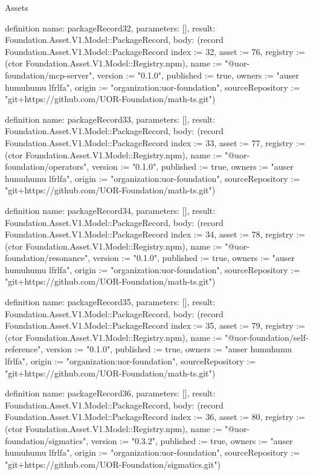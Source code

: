\begin{lexlean}{Assets}
\begin{semanticmodule}
definition{
  name: packageRecord32,
  parameters: [],
  result: Foundation.Asset.V1.Model::PackageRecord,
  body: (record Foundation.Asset.V1.Model::PackageRecord {index := 32, asset := 76, registry := (ctor Foundation.Asset.V1.Model::Registry.npm), name := "@uor-foundation/mcp-server", version := "0.1.0", published := true, owners := "auser humuhumu lfrlfa", origin := "organization:uor-foundation", sourceRepository := "git+https://github.com/UOR-Foundation/math-ts.git"})
}

definition{
  name: packageRecord33,
  parameters: [],
  result: Foundation.Asset.V1.Model::PackageRecord,
  body: (record Foundation.Asset.V1.Model::PackageRecord {index := 33, asset := 77, registry := (ctor Foundation.Asset.V1.Model::Registry.npm), name := "@uor-foundation/operators", version := "0.1.0", published := true, owners := "auser humuhumu lfrlfa", origin := "organization:uor-foundation", sourceRepository := "git+https://github.com/UOR-Foundation/math-ts.git"})
}

definition{
  name: packageRecord34,
  parameters: [],
  result: Foundation.Asset.V1.Model::PackageRecord,
  body: (record Foundation.Asset.V1.Model::PackageRecord {index := 34, asset := 78, registry := (ctor Foundation.Asset.V1.Model::Registry.npm), name := "@uor-foundation/resonance", version := "0.1.0", published := true, owners := "auser humuhumu lfrlfa", origin := "organization:uor-foundation", sourceRepository := "git+https://github.com/UOR-Foundation/math-ts.git"})
}

definition{
  name: packageRecord35,
  parameters: [],
  result: Foundation.Asset.V1.Model::PackageRecord,
  body: (record Foundation.Asset.V1.Model::PackageRecord {index := 35, asset := 79, registry := (ctor Foundation.Asset.V1.Model::Registry.npm), name := "@uor-foundation/self-reference", version := "0.1.0", published := true, owners := "auser humuhumu lfrlfa", origin := "organization:uor-foundation", sourceRepository := "git+https://github.com/UOR-Foundation/math-ts.git"})
}

definition{
  name: packageRecord36,
  parameters: [],
  result: Foundation.Asset.V1.Model::PackageRecord,
  body: (record Foundation.Asset.V1.Model::PackageRecord {index := 36, asset := 80, registry := (ctor Foundation.Asset.V1.Model::Registry.npm), name := "@uor-foundation/sigmatics", version := "0.3.2", published := true, owners := "auser humuhumu lfrlfa", origin := "organization:uor-foundation", sourceRepository := "git+https://github.com/UOR-Foundation/sigmatics.git"})
}


\end{semanticmodule}
\end{lexlean}
